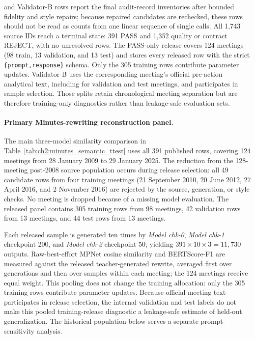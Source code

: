 \begin{table}[htbp]
\begin{threeparttable}
\begin{tablenotes}[flushleft]
        and Validator-B rows report the final audit-record inventories after
        bounded fidelity and style repairs; because repaired candidates are
        rechecked, these rows should not be read as counts from one linear
        sequence of single calls. All 1,743 source IDs reach a terminal state:
        391 PASS and 1,352 quality or contract REJECT, with no unresolved rows.
        The PASS-only release covers 124 meetings (98 train, 13 validation, and
        13 test) and stores every released row with the strict
        \texttt{\{prompt,response\}} schema. Only the 305 training rows
        contribute parameter updates. Validator B uses the corresponding
        meeting's official pre-action analytical text, including for validation
        and test meetings, and participates in sample selection. Those splits
        retain chronological meeting separation but are therefore training-only
        diagnostics rather than leakage-safe evaluation sets.
    \end{tablenotes}
    \end{threeparttable}
\end{table}



\paragraph*{Primary Minutes-rewriting reconstruction panel.}
The main three-model similarity comparison in
Table~\ref{tab:ch2:minutes_semantic_ttest} uses all 391 published rows,
covering 124 meetings from 28 January 2009 to 29 January 2025. The reduction
from the 128-meeting post-2008 source population occurs during release
selection: all 49 candidate rows from four training meetings
(21 September 2010, 20 June 2012, 27 April 2016, and 2 November 2016) are
rejected by the source, generation, or style checks. No meeting is dropped
because of a missing model evaluation. The released panel contains 305
training rows from 98 meetings, 42 validation rows from 13 meetings, and
44 test rows from 13 meetings.

Each released sample is generated ten times by \textit{Model chk-0},
\textit{Model chk-1} checkpoint 200, and \textit{Model chk-2} checkpoint 50,
yielding \(391\times10\times3=11{,}730\) outputs. Raw-best-effort MPNet
cosine similarity and BERTScore-F1 are measured against the released
teacher-generated rewrite, averaged first over generations and then over
samples within each meeting; the 124 meetings receive equal weight. This
pooling does not change the training allocation: only the 305 training rows
contribute parameter updates. Because official meeting text participates in
release selection, the internal validation and test labels do not make this
pooled training-release diagnostic a leakage-safe estimate of held-out
generalization. The historical population below serves a separate
prompt-sensitivity analysis.

